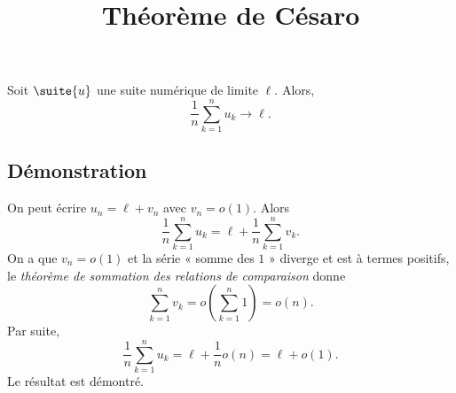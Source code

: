 \documentclass[fontsize=12pt,twoside=false,parskip=half]{scrartcl}
\title{Théorème de Césaro}
\date{}
\author{}
\begin{document}
\maketitle
   \begin{Theoreme}
      Soit $\suite{u}$ une suite numérique de limite $\ell$. Alors,
      \[
         \frac{1}{n}\sum_{k = 1}^n u_k \to \ell.
      \]
   \end{Theoreme}
   \subsection{Démonstration}
      On peut écrire $u_n = \ell + v_n$ avec $v_n = o(1)$. Alors
      \[
        \frac{1}{n}\sum_{k = 1}^n u_k = \ell + \frac{1}{n}\sum_{k = 1}^n v_k. 
      \]
      On a que $v_n = o(1)$ et la série « somme des $1$ » diverge et est à termes positifs, le \emph{théorème de sommation 
      des relations de comparaison} donne
      \[
         \sum_{k = 1}^n v_k = o\left(\sum_{k = 1}^n 1\right) = o(n).
      \]
      Par suite,
      \[
         \frac{1}{n}\sum_{k = 1}^n u_k = \ell + \frac{1}{n} o(n) = \ell + o(1).
      \]
      Le résultat est démontré.
\end{document}
